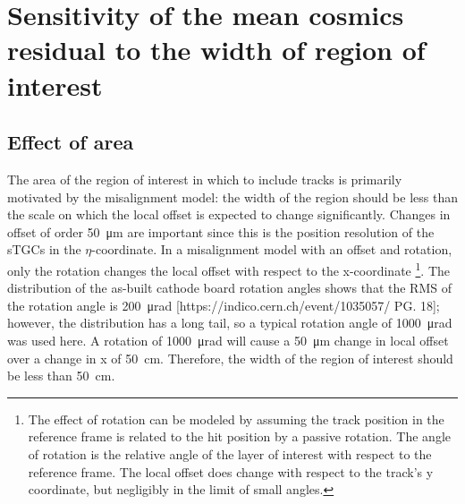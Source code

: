 \chapter[Effect of size of region of interest on results]{Sensitivity of the mean cosmics residual to the width of region of interest}
\label{appendix-area_bin_size}

\section{Effect of area}


The area of the region of interest in which to include tracks is primarily motivated by the misalignment model: the width of the region should be less than the scale on which the local offset is expected to change significantly. Changes in offset of order \SI{50}{\micro\meter} are important since this is the position resolution of the sTGCs in the $\eta$-coordinate. In a misalignment model with an offset and rotation, only the rotation changes the local offset with respect to the x-coordinate \footnote{The effect of rotation can be modeled by assuming the track position in the reference frame is related to the hit position by a passive rotation. The angle of rotation is the relative angle of the layer of interest with respect to the reference frame. The local offset does change with respect to the track's y coordinate, but negligibly in the limit of small angles.}.  The distribution of the as-built cathode board rotation angles shows that the RMS of the rotation angle is \SI{200}{\micro\radian} [https://indico.cern.ch/event/1035057/ PG. 18]; however, the distribution has a long tail, so a typical rotation angle of \SI{1000}{\micro\radian} was used here. A rotation of \SI{1000}{\micro\radian} will cause a \SI{50}{\micro\meter} change in local offset over a change in x of \SI{50}{\centi\meter}. Therefore, the width of the region of interest should be less than \SI{50}{\centi\meter}.

